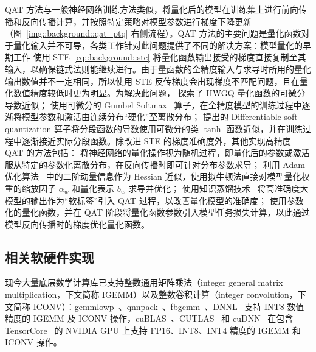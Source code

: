\documentclass[
  fontset = mac,
]{shtthesis}
\begin{document}
QAT 方法与一般神经网络训练方法类似，将量化后的模型在训练集上进行前向传播和反向传播计算，并按照特定策略对模型参数进行梯度下降更新（图~\ref{img::background::qat_ptq} 右侧流程）。QAT 方法的主要问题是量化函数对于量化输入并不可导，各类工作针对此问题提供了不同的解决方案：模型量化的早期工作 \citet{courbariaux2015binaryconnect, hubara2016binarized, rastegari2016xnor, zhou2016dorefanet} 使用 STE~\eqref{eq::background::ste} 将量化函数输出接受的梯度直接复制至其输入，以确保链式法则能继续进行。由于量函数的全精度输入与求导时所用的量化输出数值并不一定相同，所以使用 STE 反传梯度会出现梯度不匹配问题，且在量化数值精度较低时更为明显。为解决此问题，\citet{cai2017deep} 探索了 HWGQ 量化函数的可微分导数近似；\citet{louizos2018relaxed} 使用可微分的 Gumbel Softmax~\citep{jang2016categorical, maddison2016concrete} 算子，在全精度模型的训练过程中逐渐将模型参数和激活由连续分布“硬化”至离散分布；\citet{gong2019differentiable} 提出的 Differentiable soft quantization 算子将分段函数的导数使用可微分的类 $\tanh$ 函数近似，并在训练过程中逐渐接近实际分段函数。除改进 STE 的梯度准确度外，其他实现高精度 QAT 的方法包括：\citet{peters2018probabilistic, shayer2018learning} 将神经网络的量化操作视为随机过程，即量化后的参数或激活服从特定的参数化离散分布，在反向传播时即可针对分布参数求导；\citet{hou2016loss, hou2018loss} 利用 Adam 优化算法~\citep{kingma2014adam} 中的二阶动量信息作为 Hessian 近似，使用拟牛顿法直接对模型量化权重的缩放因子 $\alpha_w$ 和量化表示 $b_w$ 求导并优化；\citet{polino2018model, mishra2018apprentice} 使用知识蒸馏技术~\citep{hinton2015distilling} 将高准确度大模型的输出作为“软标签”引入 QAT 过程，以改善量化模型的准确度；\citet{jung2019learning} 使用参数化的量化函数，并在 QAT 阶段将量化函数参数引入模型任务损失计算，以此通过模型反向传播时的梯度优化量化函数。
\subsection{相关软硬件实现}
现今大量底层数学计算库已支持整数通用矩阵乘法（integer general matrix multiplication，下文简称 IGEMM）以及整数卷积计算（integer convolution，下文简称 ICONV）：gemmlowp~\citep{google2018gemmlowp}、qnnpack~\citep{facebook2018qnnpack}、fbgemm~\citep{facebook2018fbgemm}、DNNL~\citep{intel2019dnnl} 支持 INT8 数值精度的 IGEMM 及 ICONV 操作，cuBLAS~\citep{nvidia2008cublas}、CUTLAS~\citep{nvidia2019cutlass} 和 cuDNN~\citep{chetlur2014cudnn} 在包含 TensorCore~\citep{nvidia2018turing} 的 NVIDIA GPU 上支持 FP16、INT8、INT4 精度的 IGEMM 和 ICONV 操作。
\end{document}
